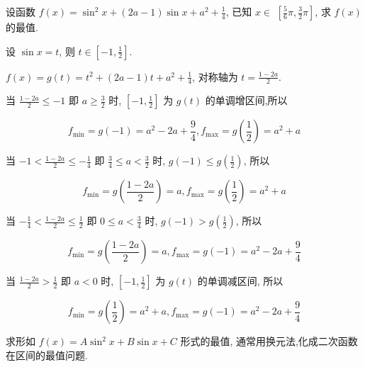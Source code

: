 \begin{example}
	设函数 $f(x)=\sin ^{2} x+(2 a-1) \sin x+a^{2}+\frac{1}{4}$, 已知 $x \in$ $\left[\frac{5}{6} \pi, \frac{3}{2} \pi\right]$, 求 $f(x)$ 的最值.
\end{example}
\begin{solution}
	设 $\sin x=t$, 则 $t \in\left[-1, \frac{1}{2}\right]$.

	$f(x)=g(t)=t^{2}+(2 a-1) t+a^{2}+\frac{1}{4}$, 对称轴为 $t=\frac{1-2 a}{2}$.

	当 $\frac{1-2 a}{2} \leqslant-1$ 即 $a \geqslant \frac{3}{2}$ 时, $\left[-1, \frac{1}{2}\right]$ 为 $g(t)$ 的单调增区间,所以

	$$
		f_{\min }=g(-1)=a^{2}-2 a+\frac{9}{4}, f_{\max }=g\left(\frac{1}{2}\right)=a^{2}+a
	$$

	当 $-1<\frac{1-2 a}{2} \leqslant-\frac{1}{4}$ 即 $\frac{3}{4} \leqslant a<\frac{3}{2}$ 时, $g(-1) \leqslant g\left(\frac{1}{2}\right)$, 所以

	$$
		f_{\min }=g\left(\frac{1-2 a}{2}\right)=a, f_{\max }=g\left(\frac{1}{2}\right)=a^{2}+a
	$$

	当 $-\frac{1}{4}<\frac{1-2 a}{2} \leqslant \frac{1}{2}$ 即 $0 \leqslant a<\frac{3}{4}$ 时, $g(-1)>g\left(\frac{1}{2}\right)$, 所以

	$$
		f_{\min }=g\left(\frac{1-2 a}{2}\right)=a, f_{\max }=g(-1)=a^{2}-2 a+\frac{9}{4}
	$$

	当 $\frac{1-2 a}{2}>\frac{1}{2}$ 即 $a<0$ 时, $\left[-1, \frac{1}{2}\right]$ 为 $g(t)$ 的单调减区间, 所以

	$$
		f_{\min }=g\left(\frac{1}{2}\right)=a^{2}+a, f_{\max }=g(-1)=a^{2}-2 a+\frac{9}{4}
	$$
\end{solution}
\begin{note}
	求形如 $f(x)=A \sin ^{2} x+B \sin x+C$ 形式的最值, 通常用换元法,化成二次函数在区间的最值问题.
\end{note}

